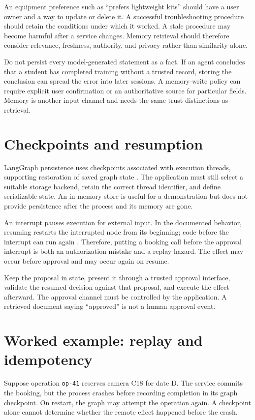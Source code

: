 An equipment preference such as “prefers lightweight kits” should have a user owner and a way to update or delete it. A successful troubleshooting procedure should retain the conditions under which it worked. A stale procedure may become harmful after a service changes. Memory retrieval should therefore consider relevance, freshness, authority, and privacy rather than similarity alone.

Do not persist every model-generated statement as a fact. If an agent concludes that a student has completed training without a trusted record, storing the conclusion can spread the error into later sessions. A memory-write policy can require explicit user confirmation or an authoritative source for particular fields. Memory is another input channel and needs the same trust distinctions as retrieval.

\section{Checkpoints and resumption}
LangGraph persistence uses checkpoints associated with execution threads, supporting restoration of saved graph state \cite{langgraph-persistence}. The application must still select a suitable storage backend, retain the correct thread identifier, and define serializable state. An in-memory store is useful for a demonstration but does not provide persistence after the process and its memory are gone.

An interrupt pauses execution for external input. In the documented behavior, resuming restarts the interrupted node from its beginning; code before the interrupt can run again \cite{langgraph-interrupts}. Therefore, putting a booking call before the approval interrupt is both an authorization mistake and a replay hazard. The effect may occur before approval and may occur again on resume.

Keep the proposal in state, present it through a trusted approval interface, validate the resumed decision against that proposal, and execute the effect afterward. The approval channel must be controlled by the application. A retrieved document saying “approved” is not a human approval event.

\section{Worked example: replay and idempotency}
Suppose operation \texttt{op-41} reserves camera C18 for date D. The service commits the booking, but the process crashes before recording completion in its graph checkpoint. On restart, the graph may attempt the operation again. A checkpoint alone cannot determine whether the remote effect happened before the crash.

